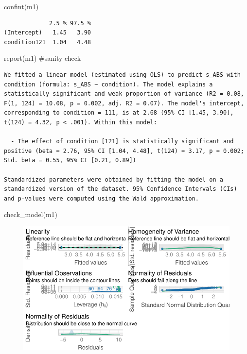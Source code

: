 \documentclass[
  letterpaper,
  DIV=11,
  numbers=noendperiod]{scrreprt}
\newenvironment{Shaded}{\begin{snugshade}}{\end{snugshade}}
\newcommand{\CommentTok}[1]{\textcolor[rgb]{0.37,0.37,0.37}{#1}}
\newcommand{\FunctionTok}[1]{\textcolor[rgb]{0.28,0.35,0.67}{#1}}
\newcommand{\NormalTok}[1]{\textcolor[rgb]{0.00,0.23,0.31}{#1}}
\begin{document}
\begin{Shaded}
\begin{Highlighting}[]
\FunctionTok{confint}\NormalTok{(m1)}
\end{Highlighting}
\end{Shaded}

\begin{verbatim}
             2.5 % 97.5 %
(Intercept)   1.45   3.90
condition121  1.04   4.48
\end{verbatim}

\begin{Shaded}
\begin{Highlighting}[]
\FunctionTok{report}\NormalTok{(m1) }\CommentTok{\#sanity check}
\end{Highlighting}
\end{Shaded}

\begin{verbatim}
We fitted a linear model (estimated using OLS) to predict s_ABS with condition (formula: s_ABS ~ condition). The model explains a statistically significant and weak proportion of variance (R2 = 0.08, F(1, 124) = 10.08, p = 0.002, adj. R2 = 0.07). The model's intercept, corresponding to condition = 111, is at 2.68 (95% CI [1.45, 3.90], t(124) = 4.32, p < .001). Within this model:

  - The effect of condition [121] is statistically significant and positive (beta = 2.76, 95% CI [1.04, 4.48], t(124) = 3.17, p = 0.002; Std. beta = 0.55, 95% CI [0.21, 0.89])

Standardized parameters were obtained by fitting the model on a standardized version of the dataset. 95% Confidence Intervals (CIs) and p-values were computed using the Wald approximation.
\end{verbatim}

\begin{Shaded}
\begin{Highlighting}[]
\FunctionTok{check\_model}\NormalTok{(m1)}
\end{Highlighting}
\end{Shaded}

\begin{figure}[H]

{\centering \includegraphics{analysis/SGC3A/4_sgc3A_hypotesting_files/figure-pdf/MODEL-cumulative-score-LAB-1.pdf}

}

\end{figure}
\end{document}
